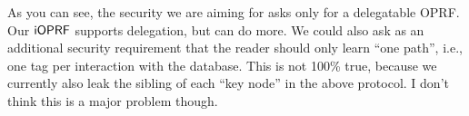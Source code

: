 \documentclass{article}
\begin{document}
As you can see, the security we are aiming for asks only for a
delegatable OPRF. Our $\mathsf{i}\mathsf{OPRF}$ supports delegation, but can do more. We
could also ask as an additional security requirement that the reader
should only learn ``one path'', i.e., one tag per interaction with the
database. This is not 100\% true, because we currently also leak the
sibling of each ``key node'' in the above protocol. I don't think this
is a major problem though.
\end{document}
